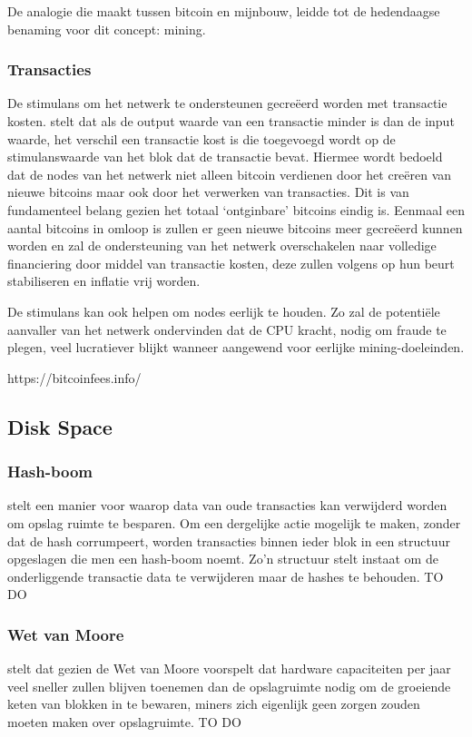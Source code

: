 		De analogie die \textcite{Nakamoto2008} maakt tussen bitcoin en mijnbouw, leidde tot de hedendaagse benaming voor dit concept: mining. 
		
		\subsubsection{Transacties}
		De stimulans om het netwerk te ondersteunen gecreëerd worden met transactie kosten. \textcite{Nakamoto2008} stelt dat als de output waarde van een transactie minder is dan de input waarde, het verschil een transactie kost is die toegevoegd wordt op de stimulanswaarde van het blok dat de transactie bevat. Hiermee wordt bedoeld dat de nodes van het netwerk niet alleen bitcoin verdienen door het creëren van nieuwe bitcoins maar ook door het verwerken van transacties. Dit is van fundamenteel belang gezien het totaal ‘ontginbare’ bitcoins eindig is. Eenmaal een aantal bitcoins in omloop is zullen er geen nieuwe bitcoins meer gecreëerd kunnen worden en zal de ondersteuning van het netwerk overschakelen naar volledige financiering door middel van transactie kosten, deze zullen volgens \textcite{Nakamoto2008} op hun beurt stabiliseren en inflatie vrij worden.
		
		De stimulans kan ook helpen om nodes eerlijk te houden. Zo zal de potentiële aanvaller van het netwerk ondervinden dat de CPU kracht, nodig om fraude te plegen, veel lucratiever blijkt wanneer aangewend voor eerlijke mining-doeleinden. 
		
		https://bitcoinfees.info/
		
	\subsection{Disk Space}
		\subsubsection{Hash-boom}
		\textcite{Nakamoto2008} stelt  een manier voor waarop data van oude transacties kan verwijderd worden om opslag ruimte te besparen. Om een dergelijke actie mogelijk te maken, zonder dat de hash corrumpeert, worden transacties binnen ieder blok in een structuur opgeslagen die men een hash-boom noemt. Zo’n structuur stelt instaat om de onderliggende transactie data te verwijderen maar de hashes te behouden. TO DO
		\subsubsection{Wet van Moore}	
		\textcite{Nakamoto2008} stelt  dat gezien de Wet van Moore voorspelt dat hardware capaciteiten per jaar veel sneller zullen blijven toenemen dan de opslagruimte nodig om de groeiende keten van blokken in te bewaren, miners zich eigenlijk geen zorgen zouden moeten maken over opslagruimte. TO DO
